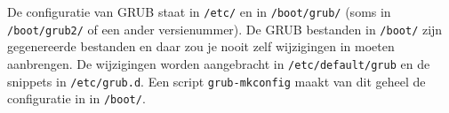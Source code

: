 De configuratie van GRUB staat in \texttt{/etc/} en in \texttt{/boot/grub/} (soms in \texttt{/boot/grub2/} of een ander versienummer). De GRUB bestanden in \texttt{/boot/} zijn gegenereerde bestanden en daar zou je nooit zelf wijzigingen in moeten aanbrengen. De wijzigingen worden aangebracht in \texttt{/etc/default/grub} en de snippets in \texttt{/etc/grub.d}. Een script \texttt{grub-mkconfig} maakt van dit geheel de configuratie in in \texttt{/boot/}.

